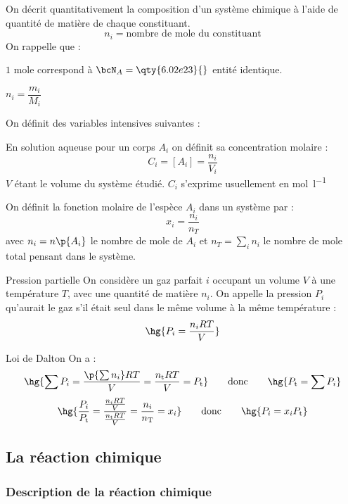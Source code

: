     On décrit quantitativement la composition d'un système chimique à l'aide de quantité de matière de chaque constituant.
    \[ n_i = \text{nombre de mole du constituant} \]
    On rappelle que :
    \begin{enumerate}
        \itt $1$ mole correspond à $\bcN_A = \qty{6.02e23}{}$ entité identique.
        
        \itt $n_i = \dfrac{m_i}{M_i}$
    \end{enumerate}
    On définit des variables intensives suivantes :
    \begin{enumerate}
        \itt En solution aqueuse pour un corps $A_i$ on définit sa concentration molaire :
        \[ C_i = [A_i] = \frac{n_i}{V_i}\]
        $V$ étant le volume du système étudié. $C_i$ s'exprime usuellement en \unit{\mol\per\litre}
        
        \itt On définit la fonction molaire de l'espèce $A_i$ dans un système par :
        \[ x_i = \frac{n_i}{n_T} \]
        avec $n_i = n\p{A_i}$ le nombre de mole de $A_i$ et $n_T = \displaystyle\sum_i n_i$ le nombre de mole total pensant dans le système.
    \end{enumerate}

    \begin{definition}{Pression partielle}{}
        On considère un gaz parfait $i$ occupant un volume $V$ à une température $T$, avec une quantité de matière $n_i$. On appelle  la pression $P_i$ qu'aurait le gaz s'il était seul dans le même volume à la même température :
        \[ \hg{P_i = \dfrac{n_iRT}{V}}\]
    \end{definition}
    \begin{property}{Loi de Dalton}{}
        On a :
        \[ \hg{\sum P_i = \dfrac{\p{\sum n_i}RT}{V} = \dfrac{n_\text tRT}{V} = P_\text t} \qquad\text{donc}\qquad \hg{P_\text t = \sum P_i}\]
        \[ \hg{\dfrac{P_i}{P_\text t} = \dfrac{\frac{n_iRT}{V}}{\frac{n_\text t RT}{V}} = \dfrac{n_i}{n_\text T} = x_i} \qquad\text{donc}\qquad \hg{P_i = x_iP_\text t}\]
    \end{property}
    
    \subsection{La réaction chimique}
    \subsubsection{Description de la réaction chimique}
    
